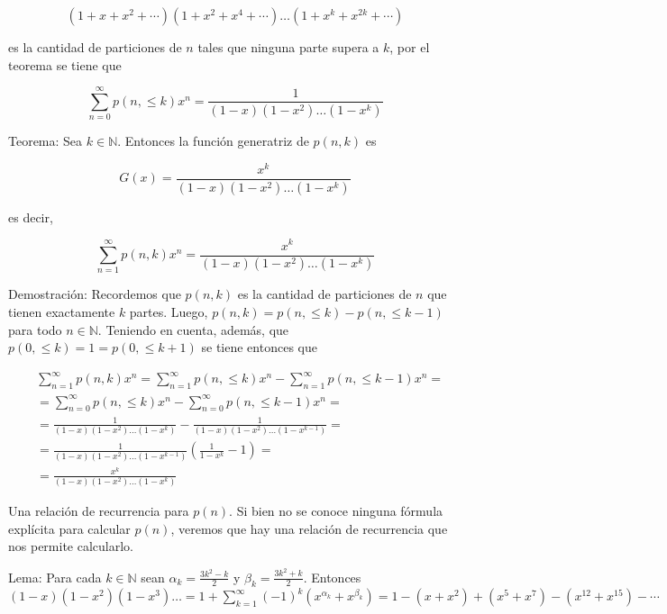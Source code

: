 \documentclass[10pt]{article}
\begin{document}
$$
\left(1+x+x^{2}+\cdots\right)\left(1+x^{2}+x^{4}+\cdots\right) \ldots\left(1+x^{k}+x^{2 k}+\cdots\right)
$$

es la cantidad de particiones de $n$ tales que ninguna parte supera a $k$, por el teorema se tiene que

$$
\sum_{n=0}^{\infty} p(n, \leq k) x^{n}=\frac{1}{(1-x)\left(1-x^{2}\right) \ldots\left(1-x^{k}\right)}
$$

Teorema: Sea $k \in \mathbb{N}$. Entonces la función generatriz de $p(n, k)$ es

$$
G(x)=\frac{x^{k}}{(1-x)\left(1-x^{2}\right) \ldots\left(1-x^{k}\right)}
$$

es decir,

$$
\sum_{n=1}^{\infty} p(n, k) x^{n}=\frac{x^{k}}{(1-x)\left(1-x^{2}\right) \ldots\left(1-x^{k}\right)}
$$

Demostración: Recordemos que $p(n, k)$ es la cantidad de particiones de $n$ que tienen exactamente $k$ partes. Luego, $p(n, k)=p(n, \leq k)-p(n, \leq k-1)$ para todo $n \in \mathbb{N}$. Teniendo en cuenta, además, que $p(0, \leq k)=1=p(0, \leq k+1)$ se tiene entonces que

$$
\begin{aligned}
& \sum_{n=1}^{\infty} p(n, k) x^{n}=\sum_{n=1}^{\infty} p(n, \leq k) x^{n}-\sum_{n=1}^{\infty} p(n, \leq k-1) x^{n}= \\
& =\sum_{n=0}^{\infty} p(n, \leq k) x^{n}-\sum_{n=0}^{\infty} p(n, \leq k-1) x^{n}= \\
& =\frac{1}{(1-x)\left(1-x^{2}\right) \ldots\left(1-x^{k}\right)}-\frac{1}{(1-x)\left(1-x^{2}\right) \ldots\left(1-x^{k-1}\right)}= \\
& =\frac{1}{(1-x)\left(1-x^{2}\right) \ldots\left(1-x^{k-1}\right)}\left(\frac{1}{1-x^{k}}-1\right)= \\
& =\frac{x^{k}}{(1-x)\left(1-x^{2}\right) \ldots\left(1-x^{k}\right)}
\end{aligned}
$$

Una relación de recurrencia para $p(n)$. Si bien no se conoce ninguna fórmula explícita para calcular $p(n)$, veremos que hay una relación de recurrencia que nos permite calcularlo.

Lema: Para cada $k \in \mathbb{N}$ sean $\alpha_{k}=\frac{3 k^{2}-k}{2}$ y $\beta_{k}=\frac{3 k^{2}+k}{2}$. Entonces\\
$(1-x)\left(1-x^{2}\right)\left(1-x^{3}\right) \ldots=1+\sum_{k=1}^{\infty}(-1)^{k}\left(x^{\alpha_{k}}+x^{\beta_{k}}\right)=1-\left(x+x^{2}\right)+\left(x^{5}+x^{7}\right)-\left(x^{12}+x^{15}\right)-\cdots$
\end{document}
